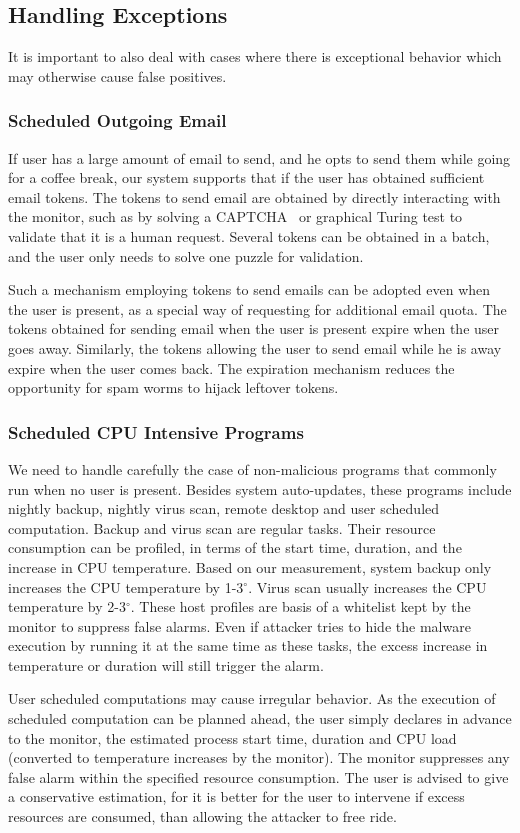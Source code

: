 \subsection{Handling Exceptions}

It is important to also deal with cases where there is exceptional
behavior which may otherwise cause false positives.

\subsubsection{Scheduled Outgoing Email}
If user has a large amount of email to send, and he opts to send them while going for a coffee break, our system supports that if the user has obtained sufficient email tokens. 
The tokens to send email are obtained by directly interacting with the monitor,
such as by solving a CAPTCHA~\cite{von2003captcha} or graphical Turing test
to validate that it is a human request.
Several tokens can be obtained in a batch, and the user only needs to solve one puzzle for validation.

Such a mechanism employing tokens to send emails can be adopted even when 
the user is present, as a special way of requesting for additional email quota. The tokens obtained for sending email when the user is present expire when 
the user goes away. 
Similarly, the tokens allowing the user to send email while he is away expire when the user comes back. The expiration mechanism reduces the opportunity 
for spam worms to hijack leftover tokens.

\subsubsection{Scheduled CPU Intensive Programs}
We need to handle carefully the case of non-malicious programs that commonly
run when no user is present. Besides system auto-updates, these
programs include nightly backup, nightly virus scan, remote desktop
and user scheduled computation. Backup and virus scan are regular
tasks. Their resource consumption can be profiled, in terms of the
start time, duration, and the increase in CPU temperature. Based on
our measurement, system backup only increases the CPU temperature by
1-3$^\circ$. Virus scan usually increases the CPU temperature by
2-3$^\circ$. These host profiles are basis of a whitelist kept by
the monitor to suppress false alarms. Even if attacker tries to hide
the malware execution by running it at the same time as these tasks,
the excess increase in temperature or duration will still trigger
the alarm.

User scheduled computations may cause irregular behavior.
As the execution of scheduled computation can be planned ahead, the
user simply declares in advance to the monitor, the estimated process
start time, duration and CPU load
(converted to temperature increases by the monitor).
The monitor suppresses any
false alarm within the specified resource consumption. The user is
advised to give a conservative estimation, for it is better for the
user to intervene if excess resources are consumed, than allowing
the attacker to free ride. 
